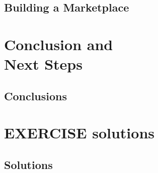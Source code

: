 \chapter{Building a Marketplace} \label{ch:Building a Marketplace}


\part{Conclusion and \\ Next Steps}
\newpage
\chapter{Conclusions} \label{ch:Conclusions}



\newpage
\part{EXERCISE solutions}
\chapter{Solutions}




\printglossary[title={Glossary}, type=main]



